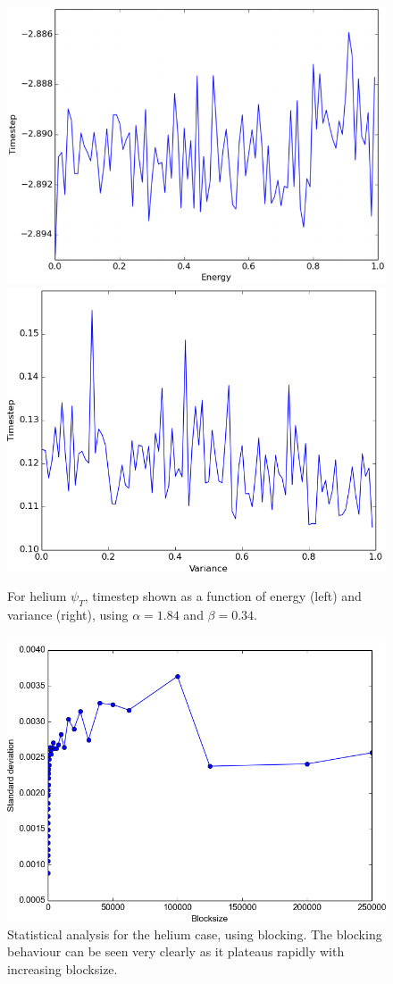 		\begin{figure}
			\centering \includegraphics[width=0.49\linewidth]{content/Results/figures/HeliumJastrowAnalyticalTimeEnergy}
			\includegraphics[width=0.49\linewidth]{content/Results/figures/HeliumJastrowAnalyticalTimeVariance}
			\protect\caption{For helium $\psi_{T}$, timestep shown as a function of energy (left) and variance (right), using $\alpha = 1.84$ and $\beta=0.34$.}
			\label{fig:HeliumTimestep}
		\end{figure}

		\begin{figure}
			\centering\includegraphics[width=0.49\linewidth]{content/Results/figures/Helium_blocking}
			\protect\caption{Statistical analysis for the helium case, using blocking. The blocking behaviour can be seen very clearly as it plateaus rapidly with increasing blocksize.}
			\label{fig:HeliumBlocking}
		\end{figure}


